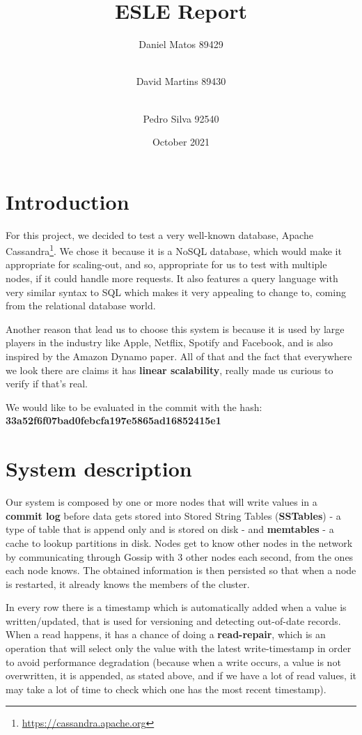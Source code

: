 \documentclass[runningheads]{llncs}
\author{
    Daniel Matos \email{daniel.m.matos@tecnico.ulisboa.pt} 89429 \and \\
    David Martins \email{david.d.martins@tecnico.ulisboa.pt } 89430 \and \\
    Pedro Silva \email{pedro.m.e.silva@tecnico.ulisboa.pt} 92540
}
\institute{Group 4}
\title{ESLE Report}
\date{October 2021}
\begin{document}
\maketitle
\section{Introduction}

For this project, we decided to test a very well-known database, Apache Cassandra\footnote{\url{https://cassandra.apache.org}}.
We chose it because it is a NoSQL database, which would make it appropriate for scaling-out, and so, appropriate for us to test with multiple nodes, if it could handle more requests. It also features a query language with very similar syntax to SQL which makes it very appealing to change to, coming from the relational database world.\par
Another reason that lead us to choose this system is because it is used by large players in the industry like Apple\cite{apple}, Netflix\cite{netflix}, Spotify\cite{spotify} and Facebook\cite{instagram}, and is also inspired by the Amazon Dynamo paper\cite{dynamo}. All of that and the fact that everywhere we look there are claims it has \textbf{linear scalability}, really made us curious to verify if that's real.\par
We would like to be evaluated in the commit with the hash: \\
\textbf{33a52f6f07bad0febcfa197e5865ad16852415e1}

\section{System description}


Our system is composed by one or more nodes that will write values in a \textbf{commit log} before data gets stored into Stored String Tables (\textbf{SSTables})\cite{scylla} - a type of table that is append only and is stored on disk - and \textbf{memtables} - a cache to lookup partitions in disk. Nodes get to know other nodes in the network by communicating through Gossip with 3 other nodes each second, from the ones each node knows. The obtained information is then persisted so that when a node is restarted, it already knows the members of the cluster.\par

In every row there is a timestamp which is automatically added when a value is written/updated, that is used for versioning and detecting out-of-date records. When a read happens, it has a chance of doing a \textbf{read-repair}, which is an operation that will select only the value with the latest write-timestamp in order to avoid performance degradation (because when a write occurs, a value is not overwritten, it is appended, as stated above, and if we have a lot of read values, it may take a lot of time to check which one has the most recent timestamp).\par
\end{document}
